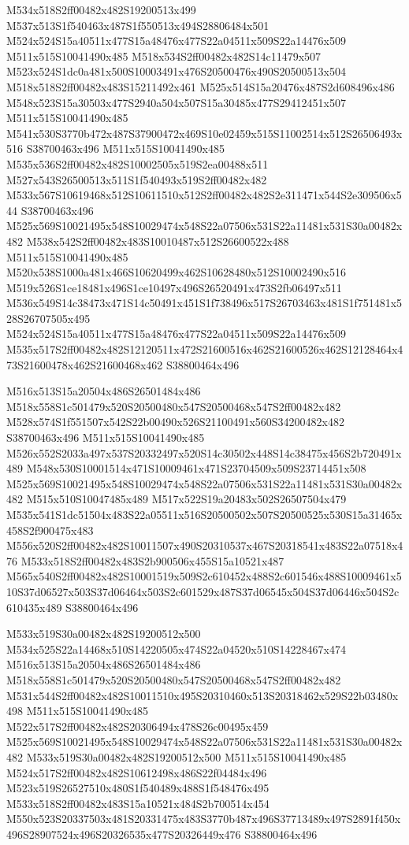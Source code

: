 \documentclass{article}
\begin{document}
\begin{multicols}{2}
M534x518S2ff00482x482S19200513x499 M537x513S1f540463x487S1f550513x494S28806484x501 M524x524S15a40511x477S15a48476x477S22a04511x509S22a14476x509 M511x515S10041490x485 M518x534S2ff00482x482S14c11479x507 M523x524S1dc0a481x500S10003491x476S20500476x490S20500513x504 M518x518S2ff00482x483S15211492x461 M525x514S15a20476x487S2d608496x486 M548x523S15a30503x477S2940a504x507S15a30485x477S29412451x507 M511x515S10041490x485 M541x530S3770b472x487S37900472x469S10e02459x515S11002514x512S26506493x516 S38700463x496 M511x515S10041490x485 M535x536S2ff00482x482S10002505x519S2ea00488x511 M527x543S26500513x511S1f540493x519S2ff00482x482 M533x567S10619468x512S10611510x512S2ff00482x482S2e311471x544S2e309506x544 S38700463x496 M525x569S10021495x548S10029474x548S22a07506x531S22a11481x531S30a00482x482 M538x542S2ff00482x483S10010487x512S26600522x488 M511x515S10041490x485 M520x538S1000a481x466S10620499x462S10628480x512S10002490x516 M519x526S1ce18481x496S1ce10497x496S26520491x473S2fb06497x511 M536x549S14c38473x471S14c50491x451S1f738496x517S26703463x481S1f751481x528S26707505x495 M524x524S15a40511x477S15a48476x477S22a04511x509S22a14476x509 M535x517S2ff00482x482S12120511x472S21600516x462S21600526x462S12128464x473S21600478x462S21600468x462 S38800464x496

M516x513S15a20504x486S26501484x486 M518x558S1c501479x520S20500480x547S20500468x547S2ff00482x482 M528x574S1f551507x542S22b00490x526S21100491x560S34200482x482 S38700463x496 M511x515S10041490x485 M526x552S2033a497x537S20332497x520S14c30502x448S14c38475x456S2b720491x489 M548x530S10001514x471S10009461x471S23704509x509S23714451x508 M525x569S10021495x548S10029474x548S22a07506x531S22a11481x531S30a00482x482 M515x510S10047485x489 M517x522S19a20483x502S26507504x479 M535x541S1dc51504x483S22a05511x516S20500502x507S20500525x530S15a31465x458S2f900475x483 M556x520S2ff00482x482S10011507x490S20310537x467S20318541x483S22a07518x476 M533x518S2ff00482x483S2b900506x455S15a10521x487 M565x540S2ff00482x482S10001519x509S2c610452x488S2c601546x488S10009461x510S37d06527x503S37d06464x503S2c601529x487S37d06545x504S37d06446x504S2c610435x489 S38800464x496

M533x519S30a00482x482S19200512x500 M534x525S22a14468x510S14220505x474S22a04520x510S14228467x474 M516x513S15a20504x486S26501484x486 M518x558S1c501479x520S20500480x547S20500468x547S2ff00482x482 M531x544S2ff00482x482S10011510x495S20310460x513S20318462x529S22b03480x498 M511x515S10041490x485 M522x517S2ff00482x482S20306494x478S26c00495x459 M525x569S10021495x548S10029474x548S22a07506x531S22a11481x531S30a00482x482 M533x519S30a00482x482S19200512x500 M511x515S10041490x485 M524x517S2ff00482x482S10612498x486S22f04484x496 M523x519S26527510x480S1f540489x488S1f548476x495 M533x518S2ff00482x483S15a10521x484S2b700514x454 M550x523S20337503x481S20331475x483S3770b487x496S37713489x497S2891f450x496S28907524x496S20326535x477S20326449x476 S38800464x496


\end{multicols}
\end{document}
